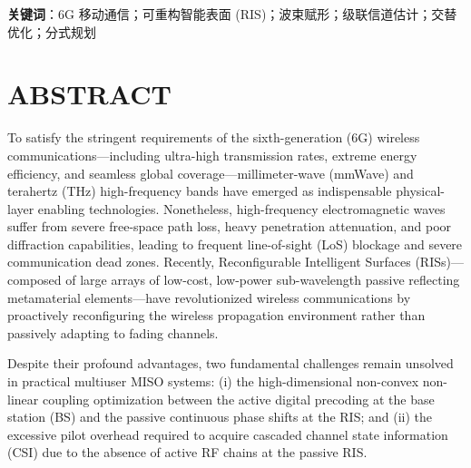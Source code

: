 \documentclass[12pt,a4paper,openany,UTF8]{ctexrep}
\begin{document}
\vspace{0.6cm}
\noindent \textbf{关键词}：6G 移动通信；可重构智能表面 (RIS)；波束赋形；级联信道估计；交替优化；分式规划

\newpage

\chapter*{ABSTRACT}

To satisfy the stringent requirements of the sixth-generation (6G) wireless communications—including ultra-high transmission rates, extreme energy efficiency, and seamless global coverage—millimeter-wave (mmWave) and terahertz (THz) high-frequency bands have emerged as indispensable physical-layer enabling technologies. Nonetheless, high-frequency electromagnetic waves suffer from severe free-space path loss, heavy penetration attenuation, and poor diffraction capabilities, leading to frequent line-of-sight (LoS) blockage and severe communication dead zones. Recently, Reconfigurable Intelligent Surfaces (RISs)—composed of large arrays of low-cost, low-power sub-wavelength passive reflecting metamaterial elements—have revolutionized wireless communications by proactively reconfiguring the wireless propagation environment rather than passively adapting to fading channels.

Despite their profound advantages, two fundamental challenges remain unsolved in practical multiuser MISO systems: (i) the high-dimensional non-convex non-linear coupling optimization between the active digital precoding at the base station (BS) and the passive continuous phase shifts at the RIS; and (ii) the excessive pilot overhead required to acquire cascaded channel state information (CSI) due to the absence of active RF chains at the passive RIS.
\end{document}
